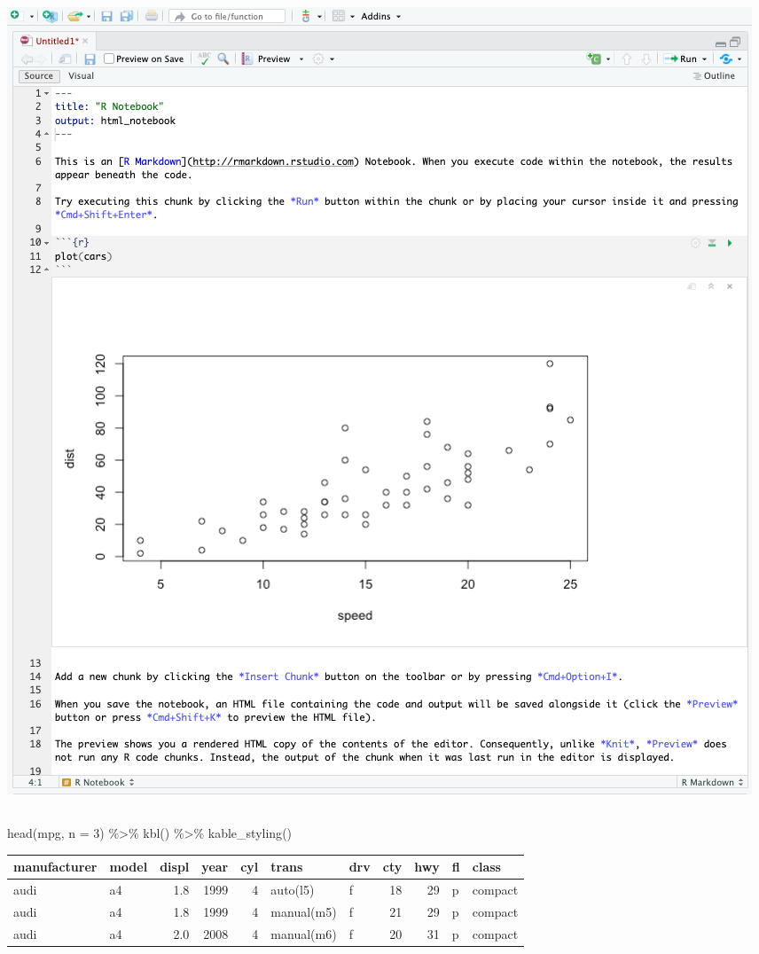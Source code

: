 \documentclass[
  letterpaper,
  DIV=11,
  numbers=noendperiod,
  landscape]{scrartcl}
\newenvironment{Shaded}{\begin{snugshade}}{\end{snugshade}}
\newcommand{\AttributeTok}[1]{\textcolor[rgb]{0.40,0.45,0.13}{#1}}
\newcommand{\DecValTok}[1]{\textcolor[rgb]{0.68,0.00,0.00}{#1}}
\newcommand{\FunctionTok}[1]{\textcolor[rgb]{0.28,0.35,0.67}{#1}}
\newcommand{\NormalTok}[1]{\textcolor[rgb]{0.00,0.23,0.31}{#1}}
\newcommand{\SpecialCharTok}[1]{\textcolor[rgb]{0.37,0.37,0.37}{#1}}
\begin{document}
\includegraphics{images/R_notebook.png}

\hypertarget{section-2}{%
\subsection{}\label{section-2}}

\begin{Shaded}
\begin{Highlighting}[]
\FunctionTok{head}\NormalTok{(mpg, }\AttributeTok{n =} \DecValTok{3}\NormalTok{) }\SpecialCharTok{\%\textgreater{}\%}
  \FunctionTok{kbl}\NormalTok{() }\SpecialCharTok{\%\textgreater{}\%}
  \FunctionTok{kable\_styling}\NormalTok{()}
\end{Highlighting}
\end{Shaded}

\begin{table}
\centering
\begin{tabular}[t]{l|l|r|r|r|l|l|r|r|l|l}
\hline
manufacturer & model & displ & year & cyl & trans & drv & cty & hwy & fl & class\\
\hline
audi & a4 & 1.8 & 1999 & 4 & auto(l5) & f & 18 & 29 & p & compact\\
\hline
audi & a4 & 1.8 & 1999 & 4 & manual(m5) & f & 21 & 29 & p & compact\\
\hline
audi & a4 & 2.0 & 2008 & 4 & manual(m6) & f & 20 & 31 & p & compact\\
\hline
\end{tabular}
\end{table}
\end{document}
